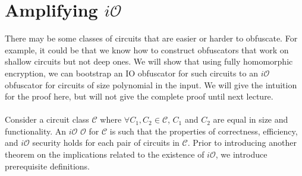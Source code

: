 \documentclass{article}
\newcommand{\io}{i\mathcal{O}}
\begin{document}
\section{Amplifying $\io$}
    There may be some classes of circuits that are easier or harder to obfuscate. For example, it could be that we know how to construct obfuscators that work on shallow circuits but not deep ones. We will show that using fully homomorphic encryption, we can bootstrap an IO obfuscator for such circuits to an $\io$ obfuscator for circuits of size polynomial in the input. We will give the intuition for the proof here, but will not give the complete proof until next lecture. \\ \\
    \noindent Consider a circuit class $\mathcal{C}$ where $\forall{C_1, C_2} \in \mathcal{C}$, $C_1$ and $C_2$ are equal in size and functionality. An $\io$ $\mathcal{O}$ for $\mathcal{C}$ is such that the properties of correctness, efficiency, and $\io$ security holds for each pair of circuits in $\mathcal{C}$. Prior to introducing another theorem on the implications related to the existence of $\io$, we introduce prerequisite definitions.
\end{document}
